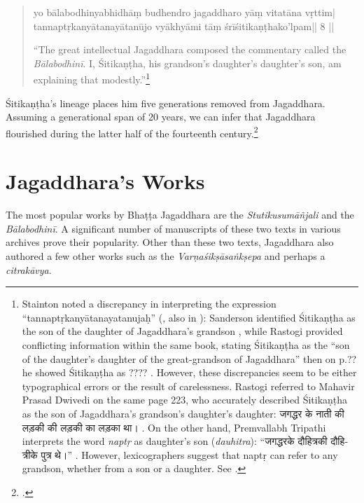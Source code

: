 \begin{quote}

\textsanskrit{yo bālabodhinyabhidhāṃ budhendro jagaddharo yāṃ vitatāna vṛttim|\\
tannaptṛkanyātanayātanūjo vyākhyāmi tāṃ śrīśitikaṇṭhako'lpam|| 8 ||}

“The great intellectual Jagaddhara composed the commentary called the \emph{Bālabodhinī}. I, Śitikaṇṭha, his grandson's daughter's daughter's son, am explaining that modestly.”\footnote{%
	Stainton noted a discrepancy in interpreting the expression “tannaptṛkanyātanayatanujaḥ” (\cite[86–87 n.94]{Stainton2019}, also in \cite[346 n.23]{Stainton2016}): Sanderson identified Śitikaṇṭha as the son of the daughter of Jagaddhara's grandson \parencite[332 n.339]{Sanderson2007}, while Rastogi provided conflicting information within the same book, stating Śitikaṇṭha as the “son of the daughter's daughter of the great-grandson of Jagaddhara” \parencite[223]{Rastogi1979} then on p.?? he showed Śitikaṇṭha as ???? \parencite{}. However, these discrepancies seem to be either typographical errors or the result of carelessness. Rastogi referred to Mahavir Prasad Dwivedi on the same page 223, who accurately described Śitikaṇṭha as the son of Jagaddhara's grandson's daughter's daughter: \texthindi{जगद्धर के नाती की लड़की की लड़की का लड़का था।} \parencite[131]{Dvivedi1928}. On the other hand, Premvallabh Tripathi interprets the word \emph{naptṛ} as daughter's son (\emph{dauhitra}): “\texthindi{जगद्धरके दौहित्रकी दौहित्रीके पुत्र थे।}” \parencite[24]{Panta1964}. However, lexicographers suggest that naptṛ can refer to any grandson, whether from a son or a daughter. See \cite[3964b]{Bhattacarya1962}.	
	} 

\end{quote}
Śitikaṇṭha's lineage places him five generations removed from Jagaddhara. Assuming a generational span of 20 years, we can infer that Jagaddhara flourished during the latter half of the fourteenth century.\footcite[3]{Durgaprasad1891} 

\section{Jagaddhara's Works}

The most popular works by Bhaṭṭa Jagaddhara are the \emph{Stutikusumāñjali} and the \emph{Bālabodhinī}. A significant number of manuscripts of these two texts in various archives prove their popularity. Other than these two texts, Jagaddhara also authored a few other works such as the \emph{Varṇaśikṣāsaṅkṣepa} and perhaps a \emph{citrakāvya}. 

